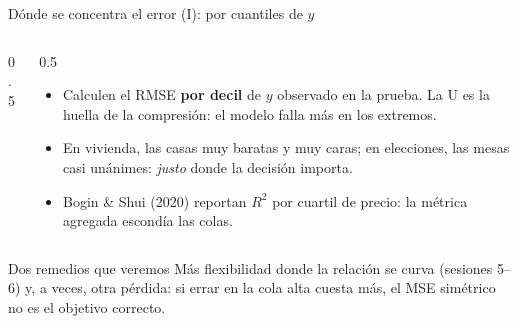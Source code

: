 \documentclass{beamer}
\newcommand{\1}{\mathbb{I}}
\begin{document}
\begin{frame}{Dónde se concentra el error (I): por cuantiles de $y$}
\small
\begin{columns}[T]
\begin{column}{0.5\textwidth}
\begin{center}
\end{center}
\end{column}
\begin{column}{0.5\textwidth}
\vspace{0.1cm}
\begin{itemize}\itemsep4pt
  \item Calculen el RMSE \textbf{por decil} de $y$ observado en la prueba. La U es la huella de la compresión: el modelo falla más en los extremos.
  \item En vivienda, las casas muy baratas y muy caras; en elecciones, las mesas casi unánimes: \emph{justo} donde la decisión importa.
  \item Bogin \& Shui (2020) reportan $R^2$ por cuartil de precio: la métrica agregada escondía las colas.
\end{itemize}
\end{column}
\end{columns}
\pause
\vspace{0.1cm}
\begin{block}{Dos remedios que veremos}
Más flexibilidad donde la relación se curva (sesiones 5--6) y, a veces, otra pérdida: si errar en la cola alta cuesta más, el MSE simétrico no es el objetivo correcto.
\end{block}
\end{frame}
\end{document}
